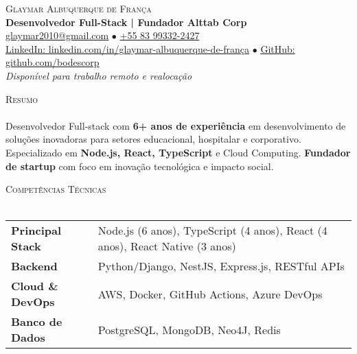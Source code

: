\documentclass[a4paper]{article}
\newcommand{\lineunder}{
    \vspace*{-8pt} \\
    \hspace*{-18pt} \hrulefill \\
}
\newcommand{\header}[1]{
    {\hspace*{-18pt}\vspace*{6pt} \textsc{#1}}
    \vspace*{-6pt} \lineunder
}
\newcommand{\skillrow}[2]{
    \textbf{#1} & #2 \\
}
\begin{document}
\vspace*{-40pt}

%
%
\begin{center}
    {\Huge \scshape {Glaymar Albuquerque de França}}\\
    \vspace*{3pt}
    {\large \textbf{Desenvolvedor Full-Stack | Fundador Alttab Corp}}\\
    \vspace*{3pt}
    \href{mailto:glaymar2010@gmail.com}{glaymar2010@gmail.com} $\bullet$ \href{https://wa.me/+5583993322427}{+55 83 99332-2427} \\
    \vspace*{2pt}
    \href{https://www.linkedin.com/in/glaymar-albuquerque-de-fran\%C3\%A7a/}{LinkedIn: linkedin.com/in/glaymar-albuquerque-de-frança} $\bullet$ \href{https://github.com/bodescorp}{GitHub: github.com/bodescorp}\\
    \vspace*{3pt}
    \textit{Disponível para trabalho remoto e realocação} \\
\end{center}

%
%
\header{Resumo}
\vspace{2mm}
Desenvolvedor Full-stack com \textbf{6+ anos de experiência} em desenvolvimento de soluções inovadoras para setores educacional, hospitalar e corporativo. Especializado em \textbf{Node.js, React, TypeScript} e Cloud Computing. \textbf{Fundador de startup} com foco em inovação tecnológica e impacto social.
\vspace{2mm}

%
%
\header{Competências Técnicas}
\vspace{2mm}
\begin{longtable}{p{3.5cm}p{12.5cm}}
    \skillrow{Principal Stack}{Node.js (6 anos), TypeScript (4 anos), React (4 anos), React Native (3 anos)}
    \skillrow{Backend}{Python/Django, NestJS, Express.js, RESTful APIs}
    \skillrow{Cloud \& DevOps}{AWS, Docker, GitHub Actions, Azure DevOps}
    \skillrow{Banco de Dados}{PostgreSQL, MongoDB, Neo4J, Redis}
\end{longtable}
\vspace{2mm}
\end{document}
